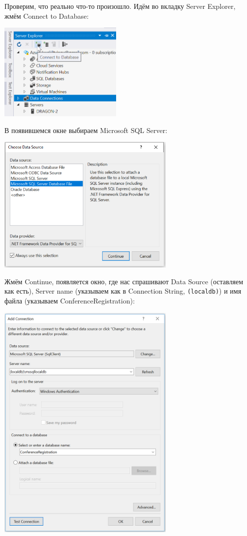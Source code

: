 \documentclass[a5paper]{article}
\begin{document}
Проверим, что реально что-то произошло. Идём во вкладку Server Explorer, жмём Connect to Database:

\begin{center}
    \includegraphics[width=0.45\textwidth]{serverExplorer.png}
\end{center}

В появившемся окне выбираем Microsoft SQL Server:

\begin{center}
    \includegraphics[width=0.65\textwidth]{chooseDataSource.png}
\end{center}

Жмём Continue, появляется окно, где нас спрашивают Data Source (оставляем как есть), Server name (указываем как в Connection String, \texttt{(localdb)\mssqllocaldb}) и имя файла (указываем ConferenceRegistration):

\begin{center}
    \includegraphics[width=0.65\textwidth]{addConnection.png}
\end{center}
\end{document}

